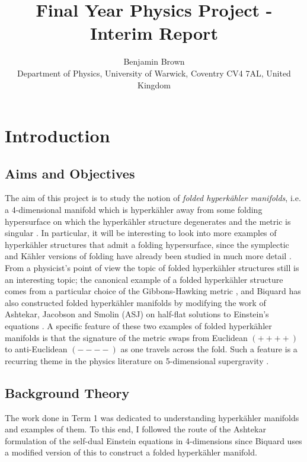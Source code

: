 \documentclass[a4paper,onecolumn,12pt]{article}
\theoremstyle{definition}
\theoremstyle{remark}
\newcommand{\K}{K\"ahler }
\newcommand{\HK}{hyperk\"ahler }
\begin{document}
\title{Final Year Physics Project - Interim Report}

\author{Benjamin Brown \\
        \small
        Department of Physics, University of Warwick,
        Coventry CV4 7AL, United Kingdom}
\date{}


\maketitle

\section{Introduction}

\subsection{Aims and Objectives}

The aim of this project is to study the notion of \emph{folded hyperk{\"a}hler manifolds}, i.e. a 4-dimensional manifold which is hyperk{\"a}hler away from some folding hypersurface on which the hyperk{\"a}hler structure degenerates and the metric is singular \cite{hitchin_2015,biquard_2015}. In particular, it will be interesting to look into more examples of \HK structures that admit a folding hypersurface, since the symplectic and \K versions of folding have already been studied in much more detail \cite{dasilva_2000,baykur_2006}.\\
From a physicist's point of view the topic of folded \HK structures still is an interesting topic; the canonical example of a folded \HK structure comes from a particular choice of the Gibbons-Hawking metric \cite{hitchin_2015}, and Biquard \cite{biquard_2015} has also constructed folded \HK manifolds by modifying the work of Ashtekar, Jacobson and Smolin (ASJ) on half-flat solutions to Einstein's equations \cite{ashtekar_1988}. A specific feature of these two examples of folded \HK manifolds is that the signature of the metric swaps from Euclidean $(++++)$ to anti-Euclidean $(----)$ as one travels across the fold. Such a feature is a recurring theme in the physics literature on 5-dimensional supergravity \cite{gibbons_2013}.

\newpage
\subsection{Background Theory}
The work done in Term 1 was dedicated to understanding \HK manifolds and examples of them. To this end, I followed the route of the Ashtekar formulation \cite{ashtekar_1987} of the self-dual Einstein equations in 4-dimensions since Biquard \cite{biquard_2015} uses a modified version of this to construct a folded \HK manifold.
\end{document}

